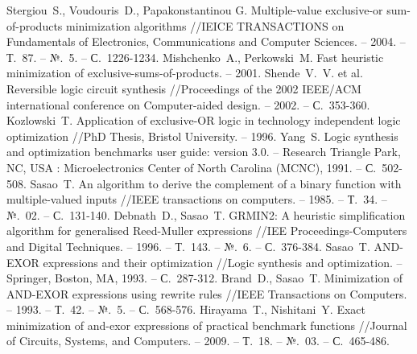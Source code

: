 \documentclass[a4paper,12pt,titlepage,finall]{article}
\begin{document}
\begin{raggedright}
\begin{thebibliography}{99}
     Stergiou~S., Voudouris~D., Papakonstantinou G. Multiple-value exclusive-or sum-of-products minimization algorithms //IEICE TRANSACTIONS on Fundamentals of Electronics, Communications and Computer Sciences. – 2004. – Т.~87. – №.~5. – С.~1226-1234.
     Mishchenko~A., Perkowski~M. Fast heuristic minimization of exclusive-sums-of-products. – 2001.
     Shende~V.~V. et al. Reversible logic circuit synthesis //Proceedings of the 2002 IEEE/ACM international conference on Computer-aided design. – 2002. – С.~353-360.
     Kozlowski~T. Application of exclusive-OR logic in technology independent logic optimization //PhD Thesis, Bristol University. – 1996.
     Yang~S. Logic synthesis and optimization benchmarks user guide: version 3.0. – Research Triangle Park, NC, USA : Microelectronics Center of North Carolina (MCNC), 1991. – С.~502-508.
     Sasao~T. An algorithm to derive the complement of a binary function with multiple-valued inputs //IEEE transactions on computers. – 1985. – Т.~34. – №.~02. – С.~131-140.
     Debnath~D., Sasao~T. GRMIN2: A heuristic simplification algorithm for generalised Reed-Muller expressions //IEE Proceedings-Computers and Digital Techniques. – 1996. – Т.~143. – №.~6. – С.~376-384.
     Sasao~T. AND-EXOR expressions and their optimization //Logic synthesis and optimization. – Springer, Boston, MA, 1993. – С.~287-312.
     Brand~D., Sasao~T. Minimization of AND-EXOR expressions using rewrite rules //IEEE Transactions on Computers. – 1993. – Т.~42. – №.~5. – С.~568-576.
     Hirayama~T., Nishitani~Y. Exact minimization of and-exor expressions of practical benchmark functions //Journal of Circuits, Systems, and Computers. – 2009. – Т.~18. – №.~03. – С.~465-486.
\end{thebibliography}
\end{raggedright}
\end{document}
